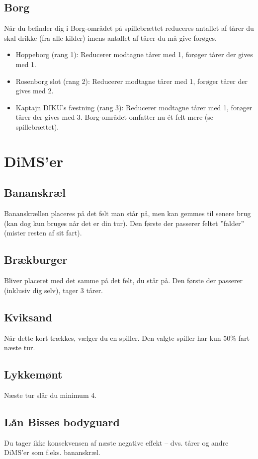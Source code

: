 \documentclass{article}
\begin{document}
\subsection{Borg}
Når du befinder dig i Borg-området på spillebrættet reduceres antallet af tårer du skal drikke (fra alle kilder) imens antallet af tårer du må give forøges.

\begin{itemize}
	\item Hoppeborg (rang 1): Reducerer modtagne tårer med 1, forøger tårer der gives med 1.
	\item Rosenborg slot (rang 2): Reducerer modtagne tårer med 1, forøger tårer der gives med 2.
	\item Kaptajn DIKU's fæstning (rang 3): Reducerer modtagne tårer med 1, forøger tårer der gives med 3. Borg-området omfatter nu ét felt mere (se spillebrættet).
\end{itemize}


\section{DiMS'er}

\subsection{Bananskræl} 
Bananskrællen placeres på det felt man står på, men kan gemmes til senere brug (kan dog kun bruges når det er din tur). Den første der passerer feltet ”falder” (mister resten af sit fart).
 
\subsection{Brækburger} 
Bliver placeret med det samme på det felt, du står på. Den første der passerer (inklusiv dig selv), tager 3 tårer.
 
\subsection{Kviksand} 
Når dette kort trækkes, vælger du en spiller. Den valgte spiller har kun 50\% fart næste tur.
 
\subsection{Lykkemønt} 
Næste tur slår du minimum 4.
 
\subsection{Lån Bisses bodyguard} 
Du tager ikke konsekvensen af næste negative effekt – dvs. tårer og andre DiMS'er som f.eks. bananskræl.
 
\end{document}
